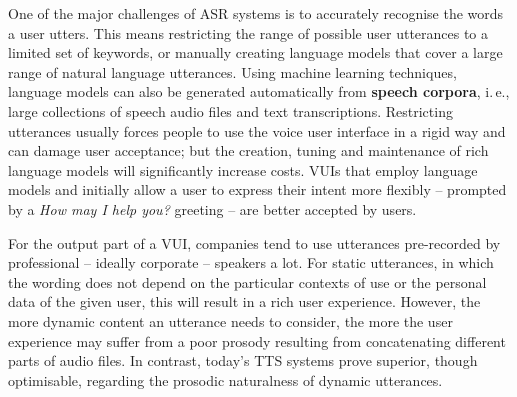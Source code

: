 \begin{multicols}{2}
\begin{itemize}
    \end{itemize}


One of the major challenges of ASR systems is to accurately recognise the words a user utters. This means restricting the range of possible user utterances to a limited set of keywords, or manually creating language models that cover a large range of natural language utterances. Using machine learning techniques, language models can also be generated automatically from \textbf{speech corpora}, i.\,e., large collections of speech audio files and text transcriptions. Restricting utterances usually forces people to use the voice user interface in a rigid way and can damage user acceptance; but the creation, tuning and maintenance of rich language models will significantly increase costs. VUIs that employ language models and initially allow a user to express their intent more flexibly -- prompted by a \textit{How may I help you?} greeting -- are better accepted by users.


For the output part of a VUI, companies tend to use utterances pre-recorded by professional – ideally corporate – speakers a lot. For static utterances, in which the wording does not depend on the particular contexts of use or the personal data of the given user, this will result in a rich user experience. However, the more dynamic content an utterance needs to consider, the more the user experience may suffer from a poor prosody resulting from concatenating different parts of audio files. In contrast, today’s TTS systems prove superior, though optimisable, regarding the prosodic naturalness of dynamic utterances.  


\end{multicols}

